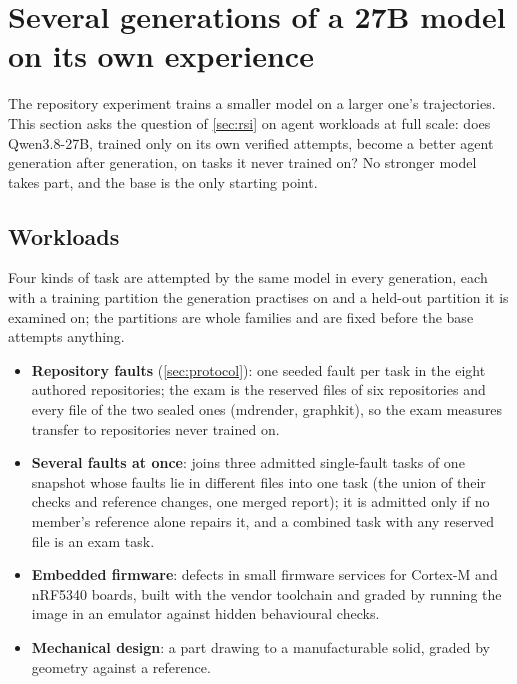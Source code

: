 
\section{Several generations of a 27B model on its own experience}\label{sec:generations}

The repository experiment trains a smaller model on a larger one's trajectories. This section asks
the question of \cref{sec:rsi} on agent workloads at full scale: does
Qwen3.8-27B, trained only on its own verified attempts, become a better agent generation after
generation, on tasks it never trained on? No stronger model takes part, and the base is the only
starting point.

\subsection{Workloads}

Four kinds of task are attempted by the same model in every generation, each with a training
partition the generation practises on and a held-out partition it is examined on; the partitions
are whole families and are fixed before the base attempts anything.
\begin{itemize}
\item \textbf{Repository faults} (\cref{sec:protocol}): one seeded fault per task in the eight
  authored repositories; the exam is the reserved files of six repositories and every file of the
  two sealed ones (mdrender, graphkit), so the exam measures transfer to repositories never trained on.
\item \textbf{Several faults at once}:  joins three admitted
  single-fault tasks of one snapshot whose faults lie in different files into one task (the union
  of their checks and reference changes, one merged report); it is admitted only if no member's
  reference alone repairs it, and a combined task with any reserved file is an exam task.
\item \textbf{Embedded firmware}: defects in small firmware services for Cortex-M and nRF5340
  boards, built with the vendor toolchain and graded by running the image in an emulator against
  hidden behavioural checks.
\item \textbf{Mechanical design}: a part drawing to a manufacturable solid, graded by geometry
  against a reference.
\end{itemize}

